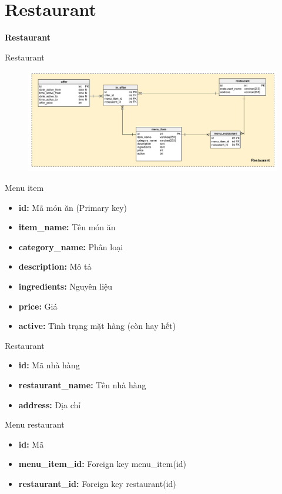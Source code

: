 \documentclass[aspectratio=43,xcolor=dvipsnames]{beamer}
\begin{document}
	\section{Restaurant}
	\begin{frame}
		\textcolor{structure}{\Huge{\textbf{Restaurant}}}
	\end{frame}
	\begin{frame}{Restaurant}
		\begin{figure}[ht!]
			\centerline{\includegraphics[width=1\textwidth]{restaurant.png}}
			\label{fig:ass1}
		\end{figure}
	\end{frame}
	\begin{frame}{Menu item}
		\begin{itemize}
			\item \textbf{id:} Mã món ăn (Primary key)
			\item \textbf{item\_name:} Tên món ăn
			\item \textbf{category\_name:} Phân loại
			\item \textbf{description:} Mô tả
			\item \textbf{ingredients:} Nguyên liệu
			\item \textbf{price:} Giá
			\item \textbf{active:} Tình trạng mặt hàng (còn hay hết)
		\end{itemize}
	\end{frame}
	
	\begin{frame}{Restaurant}
		\begin{itemize}
			\item \textbf{id: } Mã nhà hàng
			\item \textbf{restaurant\_name:} Tên nhà hàng
			\item \textbf{address:} Địa chỉ
		\end{itemize}
	\end{frame}
	
	\begin{frame}{Menu restaurant}
		\begin{itemize}
			\item \textbf{id: } Mã
			\item \textbf{menu\_item\_id: } Foreign key menu\_item(id)
			\item \textbf{restaurant\_id: } Foreign key restaurant(id)
		\end{itemize}
	\end{frame}
	
\end{document}
